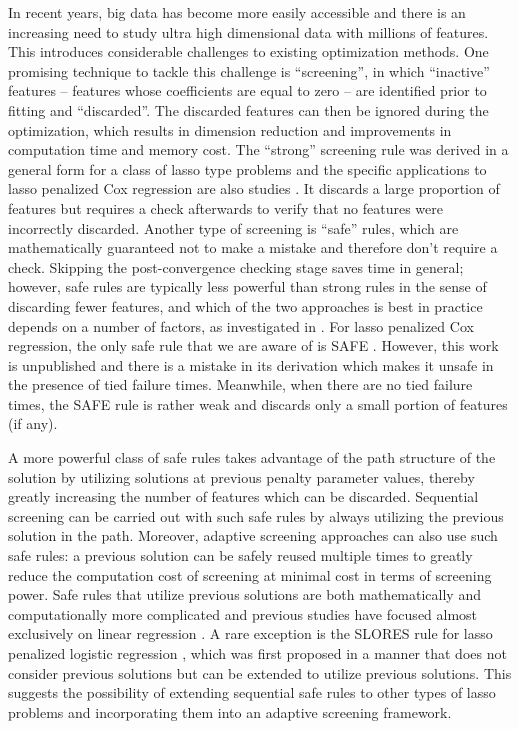 In recent years, big data has become more easily accessible and there is an increasing need to study ultra high dimensional data with millions of features. This introduces considerable challenges to existing optimization methods. One promising technique to tackle this challenge is ``screening'', in which ``inactive'' features -- features whose coefficients are equal to zero -- are identified prior to fitting and ``discarded''. The discarded features can then be ignored during the optimization, which results in dimension reduction and improvements in computation time and memory cost. The ``strong'' screening rule \citep{Tibshirani2012} was derived in a general form for a class of lasso type problems and the specific applications to lasso penalized Cox regression are also studies \citep{simon2011regularization,yang2013}. It discards a large proportion of features but requires a check afterwards to verify that no features were incorrectly discarded. Another type of screening is ``safe'' rules, which are mathematically guaranteed not to make a mistake and therefore don't require a check. Skipping the post-convergence checking stage saves time in general; however, safe rules are typically less powerful than strong rules in the sense of discarding fewer features, and which of the two approaches is best in practice depends on a number of factors, as investigated in \citep{Zeng2021}. For lasso penalized Cox regression, the only safe rule that we are aware of is SAFE \citep{ko2017solving}. However, this work is unpublished and there is a mistake in its derivation which makes it unsafe in the presence of tied failure times. Meanwhile, when there are no tied failure times, the SAFE rule is rather weak and discards only a small portion of features (if any).

A more powerful class of safe rules takes advantage of the path structure of the solution by utilizing solutions at previous penalty parameter values, thereby greatly increasing the number of features which can be discarded. Sequential screening can be carried out with such safe rules by always utilizing the previous solution in the path. Moreover, adaptive screening approaches \citep{wang2021adaptive} can also use such safe rules: a previous solution can be safely reused multiple times to greatly reduce the computation cost of screening at minimal cost in terms of screening power. Safe rules that utilize previous solutions are both mathematically and computationally more complicated and previous studies have focused almost exclusively on linear regression \citep{wang2013lasso}. A rare exception is the SLORES rule for lasso penalized logistic regression \citep{wang2014safe}, which was first proposed in a manner that does not consider previous solutions but can be extended to utilize previous solutions. This suggests the possibility of extending sequential safe rules to other types of lasso problems and incorporating them into an adaptive screening framework.

